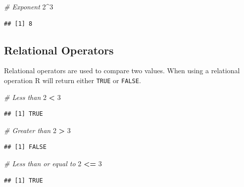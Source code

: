 \documentclass[
]{book}
\newenvironment{Shaded}{\begin{snugshade}}{\end{snugshade}}
\newcommand{\CommentTok}[1]{\textcolor[rgb]{0.56,0.35,0.01}{\textit{#1}}}
\newcommand{\DecValTok}[1]{\textcolor[rgb]{0.00,0.00,0.81}{#1}}
\newcommand{\OperatorTok}[1]{\textcolor[rgb]{0.81,0.36,0.00}{\textbf{#1}}}
\newcommand{\StringTok}[1]{\textcolor[rgb]{0.31,0.60,0.02}{#1}}
\begin{document}
\begin{Shaded}
\begin{Highlighting}[]
\CommentTok{# Exponent }
\DecValTok{2}\OperatorTok{^}\DecValTok{3}
\end{Highlighting}
\end{Shaded}

\begin{verbatim}
## [1] 8
\end{verbatim}

\hypertarget{relational-operators}{%
\subsection*{Relational Operators}\label{relational-operators}}

Relational operators are used to compare two values. When using a relational operation R will return either \texttt{TRUE} or \texttt{FALSE}.

\begin{Shaded}
\begin{Highlighting}[]
\CommentTok{# Less than }
\DecValTok{2} \OperatorTok{<}\StringTok{ }\DecValTok{3}
\end{Highlighting}
\end{Shaded}

\begin{verbatim}
## [1] TRUE
\end{verbatim}

\begin{Shaded}
\begin{Highlighting}[]
\CommentTok{# Greater than }
\DecValTok{2} \OperatorTok{>}\StringTok{ }\DecValTok{3}
\end{Highlighting}
\end{Shaded}

\begin{verbatim}
## [1] FALSE
\end{verbatim}

\begin{Shaded}
\begin{Highlighting}[]
\CommentTok{# Less than or equal to }
\DecValTok{2} \OperatorTok{<=}\StringTok{ }\DecValTok{3}
\end{Highlighting}
\end{Shaded}

\begin{verbatim}
## [1] TRUE
\end{verbatim}
\end{document}
